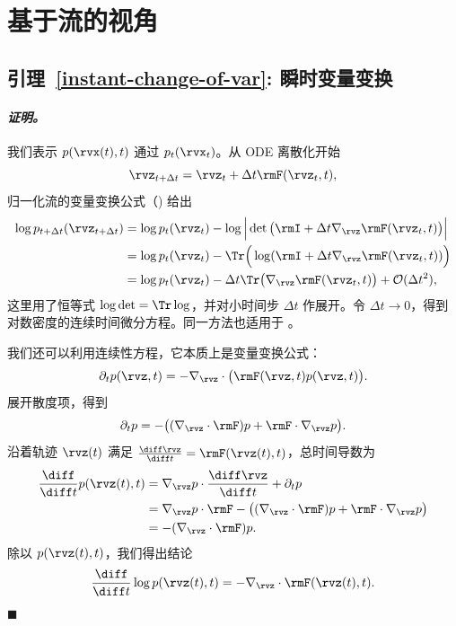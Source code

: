 \section{基于流的视角}\label{app-sec:flow-proof}

\subsection{引理~\ref{instant-change-of-var}: 瞬时变量变换}
\paragraph{\textit{证明。}}

 我们表示 $p(\rvx(t), t)$ 通过 $p_t(\rvx_t)$。从 ODE 离散化开始
\[
\rvz_{t+\Delta t} = \rvz_t + \Delta t  \rmF(\rvz_t, t),
\]
归一化流的变量变换公式（) 给出
\begin{align*}
    \log p_{t+\Delta t}(\rvz_{t+\Delta t})
    &= \log p_t(\rvz_t) - \log \Big| \det\big(\rmI + \Delta t \nabla_{\rvz} \rmF(\rvz_t, t)\big) \Big| \\
    &= \log p_t(\rvz_t) - \Tr\Big(\log(\rmI + \Delta t \nabla_{\rvz} \rmF(\rvz_t, t)) \Big) \\
    &= \log p_t(\rvz_t) - \Delta t  \Tr\big(\nabla_{\rvz} \rmF(\rvz_t, t)\big) + \mathcal{O}(\Delta t^2),
\end{align*}
这里用了恒等式 $\log \det = \Tr \log$，并对小时间步 $\Delta t$ 作展开。令 $\Delta t \to 0$，得到对数密度的连续时间微分方程。同一方法也适用于 。

\vspace{0.3cm}
 我们还可以利用连续性方程，它本质上是变量变换公式：
\[
\partial_t p(\rvz,t) = - \nabla_{\rvz} \cdot \big(\rmF(\rvz,t) p(\rvz,t)\big).
\]
展开散度项，得到
\[
\partial_t p = - \big( (\nabla_{\rvz} \cdot \rmF) p + \rmF \cdot \nabla_{\rvz} p \big).
\]
沿着轨迹 $\rvz(t)$ 满足 $\frac{\diff \rvz}{\diff t} = \rmF(\rvz(t), t)$，总时间导数为
\begin{align*}
\frac{\diff}{\diff t} p(\rvz(t), t)
&= \nabla_{\rvz} p \cdot \frac{\diff \rvz}{\diff t} + \partial_t p \\
&= \nabla_{\rvz} p \cdot \rmF - \big( (\nabla_{\rvz} \cdot \rmF) p + \rmF \cdot \nabla_{\rvz} p \big) \\
&= - (\nabla_{\rvz} \cdot \rmF) p.
\end{align*}
除以 $p(\rvz(t), t)$，我们得出结论
\[
\frac{\diff}{\diff t} \log p(\rvz(t), t) = - \nabla_{\rvz} \cdot \rmF(\rvz(t), t).
\]
\hfill$\blacksquare$


